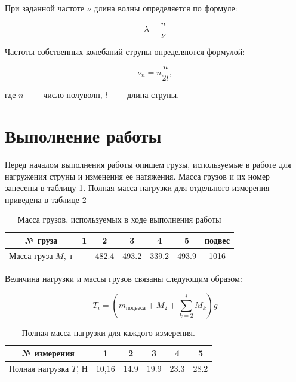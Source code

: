 \documentclass[12pt,a4paper]{article}
\begin{document}
При заданной частоте $\nu$ длина волны определяется по формуле:

\begin{equation}
	\lambda = \frac{u}{\nu}
\end{equation}

Частоты собственных колебаний струны определяются формулой:

\begin{equation}
	\nu_{n} = n\frac{u}{2l},
	\label{eq:frequency_velocity_equation}
\end{equation}

где $n -- $ число полуволн, $l -- $ длина струны.

\section{Выполнение работы}

Перед началом выполнения работы опишем грузы, используемые в работе для нагружения струны и изменения ее натяжения. Масса грузов и их номер занесены в таблицу \ref{tab:mass_of_load}. Полная масса нагрузки для отдельного измерения приведена в таблице \ref{tab:mass_of_load_for_all_measuring}

\begin{table}[h!]
\centering
\begin{tabular}{|c|c|c|c|c|c|c|}
\hline
№ груза     & 1   & 2     & 3     & 4     & 5  & подвес  \\ \hline
Масса груза $M,$ г & - & 482.4 & 493.2 & 339.2 & 493.9 & 1016 \\ \hline
\end{tabular}
\caption{Масса грузов, используемых в ходе выполнения работы}
\label{tab:mass_of_load}
\end{table}

Величина нагрузки и массы грузов связаны следующим образом:

\begin{equation}
	T_{i} = \left(m_{\text{подвеса}} + M_{2} + \sum_{k=2}^i M_{k}\right)g
\end{equation}

\begin{table}[h!]
\centering
\begin{tabular}{|c|c|c|c|c|c|}
\hline
№ измерения        & 1      & 2      & 3      & 4      & 5           \\ \hline
Полная нагрузка $T$, Н & 10,16 & 14.9 &	19.9 &	23.3 &	28.2 
 \\ \hline
\end{tabular}
\caption{Полная масса нагрузки для каждого измерения.}
\label{tab:mass_of_load_for_all_measuring}
\end{table}
\end{document}
